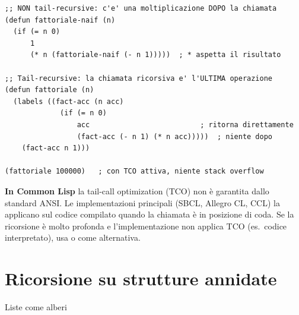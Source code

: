 \begin{esempio}
\begin{lstlisting}
;; NON tail-recursive: c'e' una moltiplicazione DOPO la chiamata
(defun fattoriale-naif (n)
  (if (= n 0)
      1
      (* n (fattoriale-naif (- n 1)))))  ; * aspetta il risultato

;; Tail-recursive: la chiamata ricorsiva e' l'ULTIMA operazione
(defun fattoriale (n)
  (labels ((fact-acc (n acc)
             (if (= n 0)
                 acc                          ; ritorna direttamente
                 (fact-acc (- n 1) (* n acc)))))  ; niente dopo
    (fact-acc n 1)))

(fattoriale 100000)   ; con TCO attiva, niente stack overflow
\end{lstlisting}
\end{esempio}

\begin{confronto}
\textbf{In Common Lisp} la tail-call optimization (TCO) non è garantita
dallo standard ANSI. Le implementazioni principali (SBCL, Allegro CL, CCL)
la applicano sul codice compilato quando la chiamata è in posizione di coda.
Se la ricorsione è molto profonda e l'implementazione non applica TCO
(es.\ codice interpretato), usa  o  come alternativa.
\end{confronto}

\section{Ricorsione su strutture annidate}

\begin{concetto}{Liste come alberi}

\boxsep
{}
\end{concetto}

